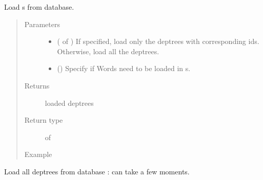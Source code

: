 \documentclass[letterpaper,10pt,english]{sphinxmanual}
\begin{document}

\begin{fulllineitems}
\label{\detokenize{index:loacore.load.deptree_load.load_dep_trees}}
Load  s from database.
\begin{quote}\begin{description}
\item[{Parameters}] \leavevmode\begin{itemize}
\item {} 
 ( of ) \textendash{} If specified, load only the deptrees with corresponding ids. Otherwise, load all the deptrees.

\item {} 
 () \textendash{} Specify if Words need to be loaded in  s.

\end{itemize}

\item[{Returns}] \leavevmode
loaded deptrees

\item[{Return type}] \leavevmode
{} of 

\item[{Example}] \leavevmode
\end{description}\end{quote}

Load all deptrees from database : can take a few moments.


\end{fulllineitems}
\end{document}
